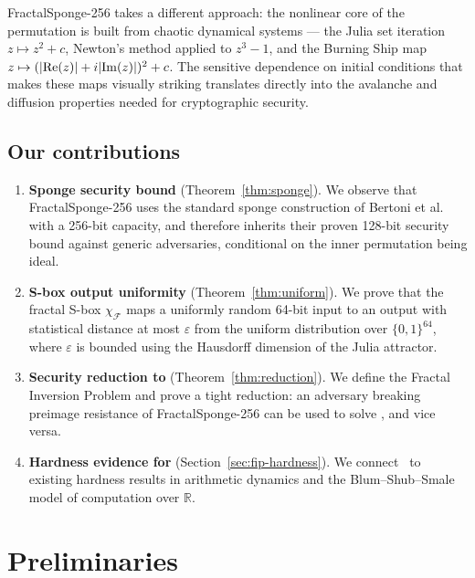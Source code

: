 \documentclass[11pt]{article}
\theoremstyle{definition}
\theoremstyle{remark}
\newcommand{\sbox}{\chi_{\mathcal{F}}} %
\newcommand{\bits}{\{0,1\}}
\newcommand{\FIP}{\mathsf{FIP}}       %
\begin{document}
FractalSponge-256 takes a different approach: the nonlinear core of the
permutation is built from chaotic dynamical systems --- the Julia set iteration
$z \mapsto z^2 + c$, Newton's method applied to $z^3 - 1$, and the Burning
Ship map $z \mapsto (|{\rm Re}(z)| + i|{\rm Im}(z)|)^2 + c$. The sensitive
dependence on initial conditions that makes these maps visually striking
translates directly into the avalanche and diffusion properties needed for
cryptographic security.

\subsection{Our contributions}

\begin{enumerate}
    \item \textbf{Sponge security bound} (Theorem~\ref{thm:sponge}). We observe
          that FractalSponge-256 uses the standard sponge construction of
          Bertoni et al.~\cite{Bertoni2007} with a 256-bit capacity, and
          therefore inherits their proven 128-bit security bound against generic
          adversaries, conditional on the inner permutation being ideal.

    \item \textbf{S-box output uniformity} (Theorem~\ref{thm:uniform}). We
          prove that the fractal S-box $\sbox$ maps a uniformly random 64-bit
          input to an output with statistical distance at most $\varepsilon$
          from the uniform distribution over $\bits^{64}$, where $\varepsilon$
          is bounded using the Hausdorff dimension of the Julia attractor.

    \item \textbf{Security reduction to \FIP} (Theorem~\ref{thm:reduction}).
          We define the Fractal Inversion Problem and prove a tight reduction:
          an adversary breaking preimage resistance of FractalSponge-256 can be
          used to solve \FIP, and vice versa.

    \item \textbf{Hardness evidence for \FIP} (Section~\ref{sec:fip-hardness}).
          We connect \FIP\ to existing hardness results in arithmetic dynamics
          and the Blum--Shub--Smale model of computation over $\mathbb{R}$.
\end{enumerate}

\section{Preliminaries}
\end{document}
